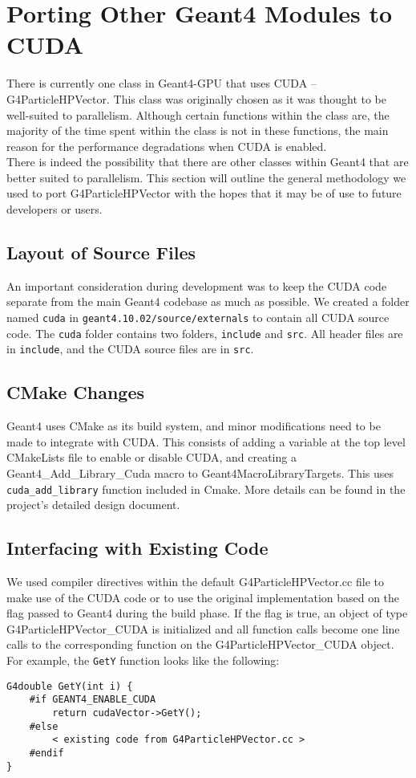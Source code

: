 \documentclass[12pt]{article}
\begin{document}
\section{Porting Other Geant4 Modules to CUDA} %
There is currently one class in Geant4-GPU that uses CUDA -- G4ParticleHPVector. This class was originally chosen as it was thought to be well-suited to parallelism. Although certain functions within the class are, the majority of the time spent within the class is not in these functions, the main reason for the performance degradations when CUDA is enabled.\\

There is indeed the possibility that there are other classes within Geant4 that are better suited to parallelism. This section will outline the general methodology we used to port G4ParticleHPVector with the hopes that it may be of use to future developers or users.

\subsection{Layout of Source Files} %
An important consideration during development was to keep the CUDA code separate from the main Geant4 codebase as much as possible. We created a folder named \texttt{cuda} in \texttt{geant4.10.02/source/externals} to contain all CUDA source code. The \texttt{cuda} folder contains two folders, \texttt{include} and \texttt{src}. All header files are in \texttt{include}, and the CUDA source files are in \texttt{src}.

\subsection{CMake Changes} %
Geant4 uses CMake as its build system, and minor modifications need to be made to integrate with CUDA. This consists of adding a variable at the top level CMakeLists file to enable or disable CUDA, and creating a {Geant4\_Add\_Library\_Cuda} macro to Geant4MacroLibraryTargets. This uses \texttt{cuda\_add\_library} function included in Cmake. More details can be found in the project's detailed design document.

\subsection{Interfacing with Existing Code} %
We used compiler directives within the default G4ParticleHPVector.cc file to make use of the CUDA code or to use the original implementation based on the flag passed to Geant4 during the build phase. If the flag is true, an object of type \\G4ParticleHPVector\_CUDA is initialized and all function calls become one line calls to the corresponding function on the G4ParticleHPVector\_CUDA object. For example, the \texttt{GetY} function looks like the following:
\begin{lstlisting}
G4double GetY(int i) {
	#if GEANT4_ENABLE_CUDA
		return cudaVector->GetY();
	#else
		< existing code from G4ParticleHPVector.cc >
	#endif
}
\end{lstlisting}
\end{document}

